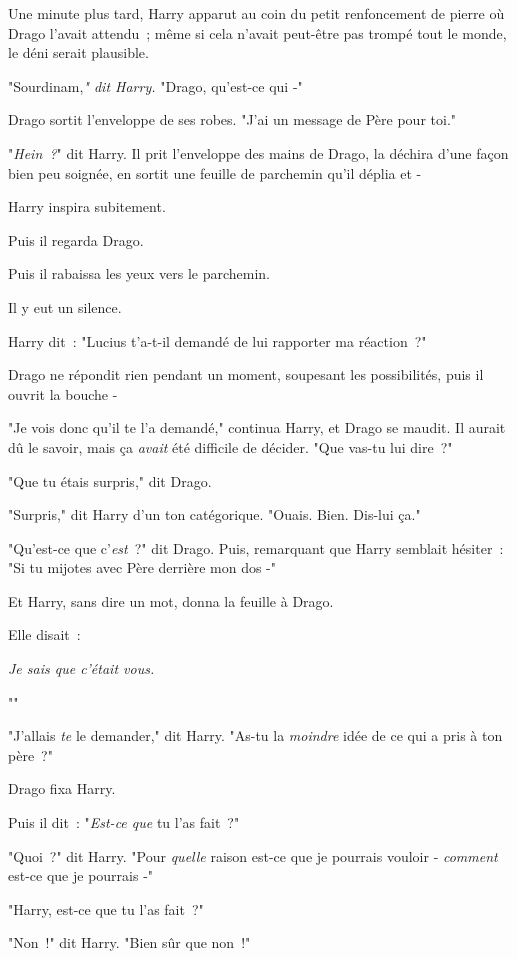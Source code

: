 Une minute plus tard, Harry apparut au coin du petit renfoncement de pierre où Drago l'avait attendu~; même si cela n'avait peut-être pas trompé tout le monde, le déni serait plausible.

"Sourdinam,\emph{" dit Harry.} "Drago, qu'est-ce qui -"

Drago sortit l'enveloppe de ses robes. "J'ai un message de Père pour toi."

"\emph{Hein~?}" dit Harry. Il prit l'enveloppe des mains de Drago, la déchira d'une façon bien peu soignée, en sortit une feuille de parchemin qu'il déplia et -

Harry inspira subitement.

Puis il regarda Drago.

Puis il rabaissa les yeux vers le parchemin.

Il y eut un silence.

Harry dit~: "Lucius t'a-t-il demandé de lui rapporter ma réaction~?"

Drago ne répondit rien pendant un moment, soupesant les possibilités, puis il ouvrit la bouche -

"Je vois donc qu'il te l'a demandé," continua Harry, et Drago se maudit. Il aurait dû le savoir, mais ça \emph{avait} été difficile de décider. "Que vas-tu lui dire~?"

"Que tu étais surpris," dit Drago.

"Surpris," dit Harry d'un ton catégorique. "Ouais. Bien. Dis-lui ça."

"Qu'est-ce que c'\emph{est}~?" dit Drago. Puis, remarquant que Harry semblait hésiter~: "Si tu mijotes avec Père derrière mon dos -"

Et Harry, sans dire un mot, donna la feuille à Drago.

Elle disait~:

\emph{Je sais que c'était vous.}

"\emph{}"

"J'allais \emph{te} le demander," dit Harry. "As-tu la \emph{moindre} idée de ce qui a pris à ton père~?"

Drago fixa Harry.

Puis il dit~: "\emph{Est-ce que} tu l'as fait~?"

"Quoi~?" dit Harry. "Pour \emph{quelle} raison est-ce que je pourrais vouloir - \emph{comment} est-ce que je pourrais -"

"Harry, est-ce que tu l'as fait~?"

"Non~!" dit Harry. "Bien sûr que non~!"

